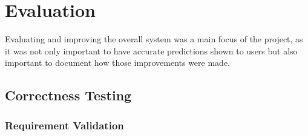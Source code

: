 





    
    
    
    
    
    
    
    
    
\chapter{Evaluation}
\label{Evaluation}
Evaluating and improving the overall system was a main focus of the project, as it was not only important to have accurate predictions shown to users but also important to document how those improvements were made.

    \section{Correctness Testing}
    
        \subsection{Requirement Validation}
        
